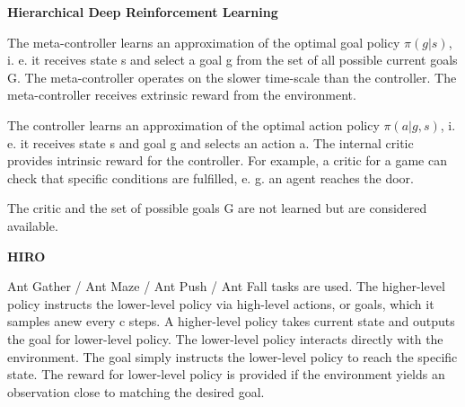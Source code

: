\documentclass{article}
\begin{document}
\textbf{Hierarchical Deep Reinforcement Learning}~\cite{Kulkarni2016HierarchicalDR}

The meta-controller learns an approximation of the optimal goal policy $\pi(g|s)$, i. e. it receives state s and select a goal g from the set of all possible current goals G. The meta-controller operates on the slower time-scale than the controller. The meta-controller receives extrinsic reward from the environment.

The controller learns an approximation of the optimal action policy $\pi(a|g,s)$, i. e. it receives state s and goal g and selects an action a. The internal critic provides intrinsic reward for the controller. For example, a critic for a game can check that specific conditions are fulfilled, e. g. an agent reaches the door.

The critic and the set of possible goals G are not learned but are considered available.

\textbf{HIRO}~\cite{Nachum2018DataEfficientHR}

Ant Gather / Ant Maze / Ant Push / Ant Fall tasks are used. The higher-level policy instructs the lower-level policy via high-level actions, or goals, which it samples anew every c steps. A higher-level policy takes current state and outputs the goal for lower-level policy. The lower-level policy interacts directly with the environment. The goal simply instructs the lower-level policy to reach the specific state. The reward for lower-level policy is provided if the environment yields an observation close to matching the desired goal.



\end{document}
